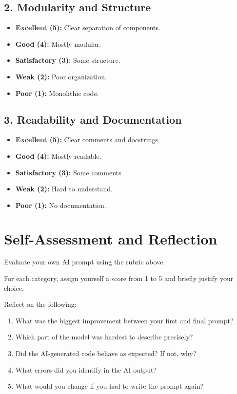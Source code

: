 \documentclass[paper=letter, fontsize=12pt]{article}
\numberwithin{equation}{section}
\begin{document}
\subsection*{2. Modularity and Structure}

\begin{itemize}
\item \textbf{Excellent (5):} Clear separation of components.
\item \textbf{Good (4):} Mostly modular.
\item \textbf{Satisfactory (3):} Some structure.
\item \textbf{Weak (2):} Poor organization.
\item \textbf{Poor (1):} Monolithic code.
\end{itemize}

\subsection*{3. Readability and Documentation}

\begin{itemize}
\item \textbf{Excellent (5):} Clear comments and docstrings.
\item \textbf{Good (4):} Mostly readable.
\item \textbf{Satisfactory (3):} Some comments.
\item \textbf{Weak (2):} Hard to understand.
\item \textbf{Poor (1):} No documentation.
\end{itemize}

\bigskip

\section*{Self-Assessment and Reflection}

\begin{taskbox}
Evaluate your own AI prompt using the rubric above.

For each category, assign yourself a score from 1 to 5 and briefly justify your choice.
\end{taskbox}

\begin{taskbox}
Reflect on the following:

\begin{enumerate}
\item What was the biggest improvement between your first and final prompt?
\item Which part of the model was hardest to describe precisely?
\item Did the AI-generated code behave as expected? If not, why?
\item What errors did you identify in the AI output?
\item What would you change if you had to write the prompt again?
\end{enumerate}
\end{taskbox}
\end{document}
